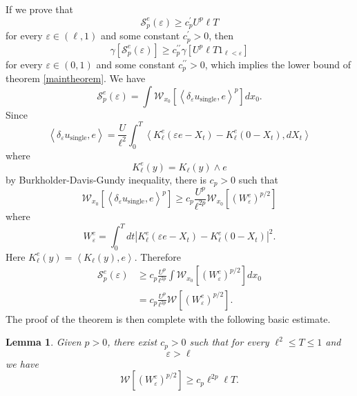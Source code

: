 \documentclass[a4paper,12pt]{article}
\newtheorem{lemma}{Lemma}
\begin{document}
If we prove that
\[
\mathcal{S}_{p}^{e}(\varepsilon)\geq c_{p}^{\prime}U^{p}\ell T
\]
for every $\varepsilon\in\left(  \ell,1\right)  $ and some constant
$c_{p}^{\prime}>0$, then
\[
\gamma\left[  \mathcal{S}_{p}^{e}(\varepsilon)\right]  \geq c_{p}%
^{\prime\prime}\gamma\left[  U^{p}\ell T1_{\ell<\varepsilon}\right]
\]
for every $\varepsilon\in\left(  0,1\right)  $ and some constant
$c_{p}^{\prime\prime}>0$, which implies the lower bound of theorem
\ref{maintheorem}. We have
\[
\mathcal{S}_{p}^{e}(\varepsilon)=\int\mathcal{W}_{x_{0}}\left[  \left\langle
\delta_{\varepsilon}u_{\text{single}},e\right\rangle ^{p}\right]  dx_{0}.
\]
Since
\[
\left\langle \delta_{\varepsilon}u_{\text{single}},e\right\rangle =\frac
{U}{\ell^{2}}\int_{0}^{T}\left\langle K_{\ell}^{e}(\varepsilon e-X_{t}%
)-K_{\ell}^{e}(0-X_{t}),dX_{t}\right\rangle
\]
where%
\[
K_{\ell}^{e}\left(  y\right)  =K_{\ell}\left(  y\right)  \wedge e
\]
by Burkholder-Davis-Gundy inequality, there is $c_{p}>0$ such that
\[
\mathcal{W}_{x_{0}}\left[  \left\langle \delta_{\varepsilon}u_{\text{single}%
},e\right\rangle ^{p}\right]  \geq c_{p}\frac{U^{p}}{\ell^{2p}}\mathcal{W}%
_{x_{0}}\left[  \left(  W_{\varepsilon}^{e}\right)  ^{p/2}\right]
\]
where
\[
W_{\varepsilon}^{e}=\int_{0}^{T}dt|K_{\ell}^{e}(\varepsilon e-X_{t})-K_{\ell
}^{e}(0-X_{t})|^{2}.
\]
Here $K_{\ell}^{e}(y)=\left\langle K_{\ell}(y),e\right\rangle $. Therefore
\begin{align*}
\mathcal{S}_{p}^{e}(\varepsilon)  &  \geq c_{p}\frac{U^{p}}{\ell^{2p}}%
\int\mathcal{W}_{x_{0}}\left[  \left(  W_{\varepsilon}^{e}\right)
^{p/2}\right]  dx_{0}\\
&  =c_{p}\frac{U^{p}}{\ell^{2p}}\mathcal{W}\left[  \left(  W_{\varepsilon}%
^{e}\right)  ^{p/2}\right]  .
\end{align*}
The proof of the theorem is then complete with the following basic estimate.

\begin{lemma}
Given $p>0$, there exist $c_{p}>0$ such that for every $\ell^{2}\leq T\leq1$
and
\[
\varepsilon>\ell
\]
we have
\[
\mathcal{W}\left[  \left(  W_{\varepsilon}^{e}\right)  ^{p/2}\right]  \geq
c_{p}\ell^{2p}\ell T.
\]
\end{lemma}
\end{document}
